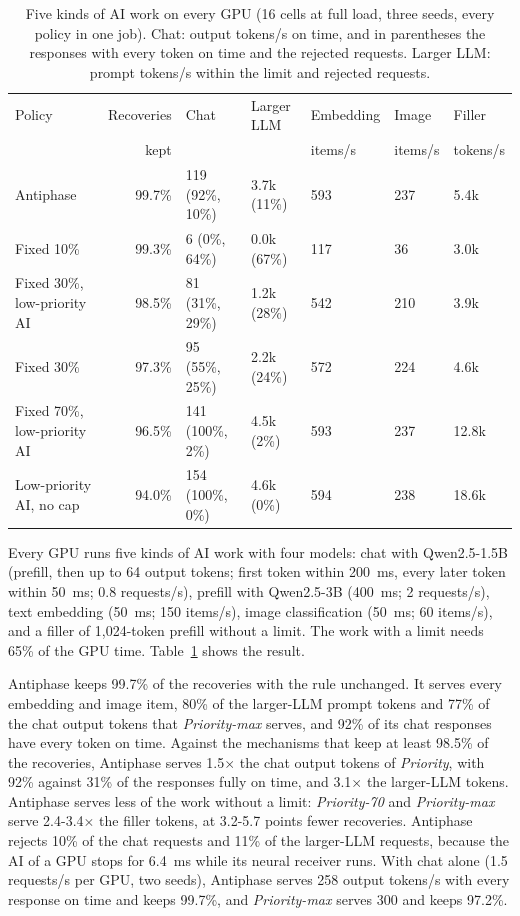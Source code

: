\documentclass[acmsmall,screen,review,anonymous]{acmart}
\newcommand{\sys}{Antiphase\xspace}
\begin{document}
\begin{table}[t]
\caption{Five kinds of AI work on every GPU (16 cells at full load, three seeds, every policy in one job).
Chat: output tokens/s on time, and in parentheses the responses with every token on time and the rejected
requests. Larger LLM: prompt tokens/s within the limit and rejected requests.}
\label{tab:kinds}
\footnotesize
\begin{tabular}{@{}lrlllll@{}}
\toprule
Policy & Recoveries & Chat & Larger LLM & Embedding & Image & Filler \\
 & kept & & & items/s & items/s & tokens/s \\
\midrule
\sys & 99.7\% & 119 (92\%, 10\%) & 3.7k (11\%) & 593 & 237 & 5.4k \\
Fixed 10\% & 99.3\% & 6 (0\%, 64\%) & 0.0k (67\%) & 117 & 36 & 3.0k \\
Fixed 30\%, low-priority AI & 98.5\% & 81 (31\%, 29\%) & 1.2k (28\%) & 542 & 210 & 3.9k \\
Fixed 30\% & 97.3\% & 95 (55\%, 25\%) & 2.2k (24\%) & 572 & 224 & 4.6k \\
Fixed 70\%, low-priority AI & 96.5\% & 141 (100\%, 2\%) & 4.5k (2\%) & 593 & 237 & 12.8k \\
Low-priority AI, no cap & 94.0\% & 154 (100\%, 0\%) & 4.6k (0\%) & 594 & 238 & 18.6k \\
\bottomrule
\end{tabular}
\end{table}

Every GPU runs five kinds of AI work with four models: chat with Qwen2.5-1.5B (prefill, then up to 64 output
tokens; first token within 200~ms, every later token within 50~ms; 0.8 requests/s), prefill with
Qwen2.5-3B (400~ms; 2 requests/s), text embedding (50~ms; 150 items/s), image classification (50~ms; 60
items/s), and a filler of 1,024-token prefill without a limit. The work with a limit needs 65\% of the GPU
time. Table~\ref{tab:kinds} shows the result.

\sys keeps 99.7\% of the recoveries with the rule unchanged. It serves every embedding and image item, 80\%
of the larger-LLM prompt tokens and 77\% of the chat output tokens that \textit{Priority-max} serves, and 92\%
of its chat responses have every token on time. Against the mechanisms that keep at least 98.5\% of the
recoveries, \sys serves 1.5$\times$ the chat output tokens of \textit{Priority}, with
92\% against 31\% of the responses fully on time, and 3.1$\times$ the larger-LLM tokens. \sys serves less of
the work without a limit: \textit{Priority-70} and \textit{Priority-max} serve 2.4-3.4$\times$
the filler tokens, at 3.2-5.7 points fewer recoveries. \sys rejects 10\% of the chat requests and 11\% of the
larger-LLM requests, because the AI of a GPU stops for 6.4~ms while its neural receiver runs. With chat
alone (1.5 requests/s per GPU, two seeds), \sys serves 258 output tokens/s with every response on time and
keeps 99.7\%, and \textit{Priority-max} serves 300 and keeps 97.2\%.
\end{document}
